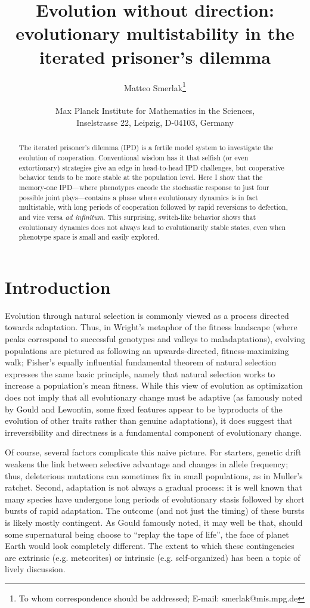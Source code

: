 \documentclass[12pt]{article}
\title{Evolution without direction: evolutionary multistability in the iterated prisoner's dilemma}
\author
{Matteo Smerlak\footnote{To whom correspondence should be addressed; E-mail:  smerlak@mis.mpg.de}\\
\\
\normalsize{Max Planck Institute for Mathematics in the Sciences,}\\
\normalsize{Inselstrasse 22, Leipzig, D-04103, Germany}\\
}
\date{}
\begin{document}
\maketitle

\begin{abstract}
The iterated prisoner's dilemma (IPD) is a fertile model system to investigate the evolution of cooperation. Conventional wisdom has it that selfish (or even extortionary) strategies give an edge in head-to-head IPD challenges, but cooperative behavior tends to be more stable at the population level. Here I show that the memory-one IPD---where phenotypes encode the stochastic response to just four possible joint plays---contains a phase where evolutionary dynamics is in fact multistable, with long periods of cooperation followed by rapid reversions to defection, and vice versa \emph{ad infinitum}. This surprising, switch-like behavior shows that evolutionary dynamics does not always lead to evolutionarily stable states, even when phenotype space is small and easily explored. 
\end{abstract}

\section*{Introduction}

Evolution through natural selection is commonly viewed as a process directed towards adaptation. Thus, in Wright's metaphor of the fitness landscape (where peaks correspond to successful genotypes and valleys to maladaptations), evolving populations are pictured as following an upwards-directed, fitness-maximizing walk; Fisher's equally influential fundamental theorem of natural selection expresses the same basic principle, namely that natural selection works to increase a population's mean fitness. While this view of evolution as optimization does not imply that all evolutionary change must be adaptive (as famously noted by Gould and Lewontin, some fixed features appear to be byproducts of the evolution of other traits rather than genuine adaptations), it does suggest that irreversibility and directness is a fundamental component of evolutionary change.  

Of course, several factors complicate this naive picture. For starters, genetic drift weakens the link between selective advantage and changes in allele frequency; thus, deleterious mutations can sometimes fix in small populations, as in Muller's ratchet. Second, adaptation is not always a gradual process: it is well known that many species have undergone long periods of evolutionary stasis followed by short bursts of rapid adaptation. The outcome (and not just the timing) of these bursts is likely mostly contingent. As Gould famously noted, it may well be that, should some supernatural being choose to ``replay the tape of life'', the face of planet Earth would look completely different. The extent to which these contingencies are extrinsic (e.g. meteorites) or intrinsic (e.g. self-organized) has been a topic of lively discussion. 
\end{document}
